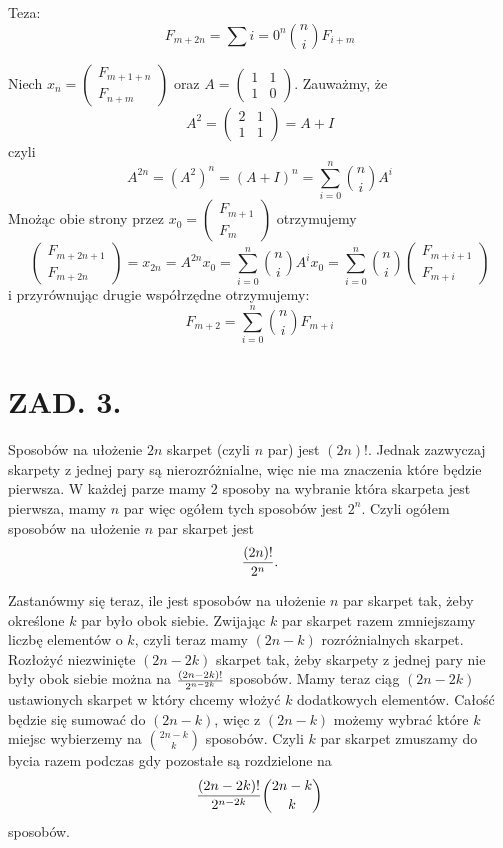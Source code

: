 \documentclass{article}[13pt]
\begin{document}
\bigskip

Teza:
$$F_{m+2n}=\sum\limits{i=0}^n{n\choose i}F_{i+m}$$

Niech $x_n=\begin{pmatrix}
    F_{m+1+n}\\F_{n+m}
\end{pmatrix}$ oraz $A=\begin{pmatrix}
    1&1\\1&0
\end{pmatrix}$. Zauważmy, że
$$A^2=\begin{pmatrix}
    2&1\\1&1
\end{pmatrix}=A+I$$
czyli
$$A^{2n}=(A^2)^n=(A+I)^n=\sum\limits_{i=0}^n{n\choose i}A^i$$
Mnożąc obie strony przez $x_0=\begin{pmatrix}
    F_{m+1}\\F_m
\end{pmatrix}$ otrzymujemy
$$\begin{pmatrix}F_{m+2n+1}\\F_{m+2n}\end{pmatrix}=x_{2n}=A^{2n}x_0=\sum\limits_{i=0}^n{n\choose i}A^ix_0=\sum\limits_{i=0}^n{n\choose i}\begin{pmatrix}
    F_{m+i+1}\\F_{m+i}
\end{pmatrix}$$
i przyrównując drugie współrzędne otrzymujemy:
$$F_{m+2}=\sum\limits_{i=0}^n{n\choose i}F_{m+i}$$


\section*{ZAD. 3.}

Sposobów na ułożenie $2n$ skarpet (czyli $n$ par) jest $(2n)!$. Jednak zazwyczaj skarpety z jednej pary są nierozróżnialne, więc nie ma znaczenia które będzie pierwsza. W każdej parze mamy $2$ sposoby na wybranie która skarpeta jest pierwsza, mamy $n$ par więc ogółem tych sposobów jest $2^n$. Czyli ogółem sposobów na ułożenie $n$ par skarpet jest
$${(2n)!\over 2^n}.$$

Zastanówmy się teraz, ile jest sposobów na ułożenie $n$ par skarpet tak, żeby określone $k$ par było obok siebie. Zwijając $k$ par skarpet razem zmniejszamy liczbę elementów o $k$, czyli teraz mamy $(2n-k)$ rozróżnialnych skarpet. Rozłożyć niezwinięte $(2n-2k)$ skarpet tak, żeby skarpety z jednej pary nie były obok siebie można na ${(2n-2k)!\over 2^{n-2k}}$ sposobów. Mamy teraz ciąg $(2n-2k)$ ustawionych skarpet w który chcemy włożyć $k$ dodatkowych elementów. Całość będzie się sumować do $(2n-k)$, więc z $(2n-k)$ możemy wybrać które $k$ miejsc wybierzemy na ${2n-k\choose k}$ sposobów. Czyli $k$ par skarpet zmuszamy do bycia razem podczas gdy pozostałe są rozdzielone na 
$${(2n-2k)!\over 2^{n-2k}}{2n-k\choose k}$$
sposobów.
\end{document}
